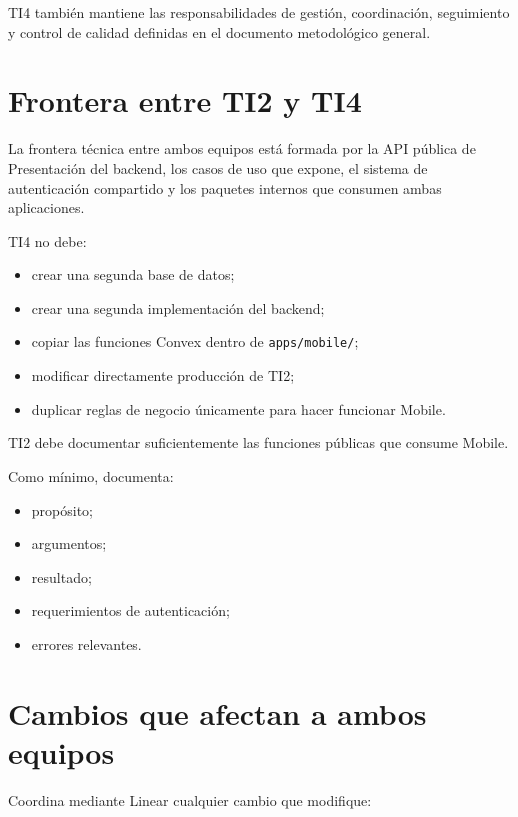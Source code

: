 \documentclass[11pt,a4paper]{article}
\begin{document}
TI4 también mantiene las responsabilidades de gestión, coordinación,
seguimiento y control de calidad definidas en el documento metodológico general.

\section{Frontera entre TI2 y TI4}

La frontera técnica entre ambos equipos está formada por la API pública de
Presentación del backend, los casos de uso que expone, el sistema de
autenticación compartido y los paquetes internos que consumen ambas
aplicaciones.

TI4 no debe:

\begin{itemize}
  \item crear una segunda base de datos;
  \item crear una segunda implementación del backend;
  \item copiar las funciones Convex dentro de \texttt{apps/mobile/};
  \item modificar directamente producción de TI2;
  \item duplicar reglas de negocio únicamente para hacer funcionar Mobile.
\end{itemize}

TI2 debe documentar suficientemente las funciones públicas que consume Mobile.

Como mínimo, documenta:

\begin{itemize}
  \item propósito;
  \item argumentos;
  \item resultado;
  \item requerimientos de autenticación;
  \item errores relevantes.
\end{itemize}

\section{Cambios que afectan a ambos equipos}

Coordina mediante Linear cualquier cambio que modifique:
\end{document}
